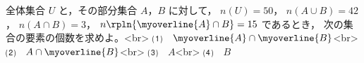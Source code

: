 全体集合 $U$ と，その部分集合 $A$，$B$ に対して，
$n(U)=50$，
$n(A \cup B)=42$，
$n(A \cap B)=3$，
$n\rpln{\myoverline{A} \cap B}=15$ であるとき，
次の集合の要素の個数を求めよ。<br>
⑴　$\myoverline{A} \cap \myoverline{B}$<br>
⑵　$A \cap \myoverline{B}$<br>
⑶　$A$<br>
⑷　$B$